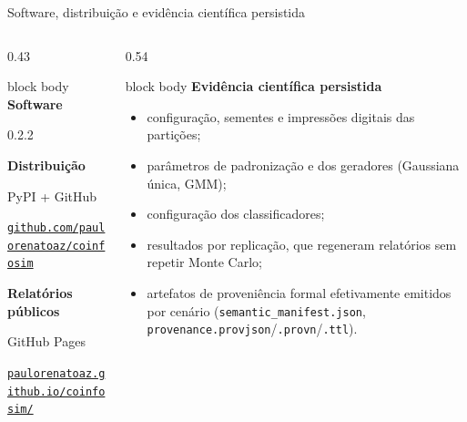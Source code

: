 \begin{frame}{Software, distribuição e evidência científica persistida}
  \begin{columns}[T,onlytextwidth]
    \begin{column}{0.43\textwidth}
      \begin{beamercolorbox}[wd=\linewidth,sep=.15cm,rounded=true]{block body}
        \fontsize{9.2}{11.0}\selectfont
        {\bfseries\color{CoInfoBlue}Software}\par
        \CoInfoSim{} 0.2.2\par\vspace{.10cm}
        {\bfseries\color{CoInfoBlue}Distribuição}\par
        PyPI + GitHub\par
        {\fontsize{7.4}{8.8}\selectfont\href{https://github.com/paulorenatoaz/coinfosim}{\texttt{github.com/\allowbreak paulorenatoaz/\allowbreak coinfosim}}}\par\vspace{.10cm}
        {\bfseries\color{CoInfoBlue}Relatórios públicos}\par
        GitHub Pages\par
        {\fontsize{7.4}{8.8}\selectfont\href{https://paulorenatoaz.github.io/coinfosim/}{\texttt{paulorenatoaz.github.io/\allowbreak coinfosim/}}}
      \end{beamercolorbox}
    \end{column}
    \begin{column}{0.54\textwidth}
      \begin{beamercolorbox}[wd=\linewidth,sep=.15cm,rounded=true]{block body}
        \fontsize{9.2}{11.0}\selectfont
        {\bfseries\color{CoInfoBlue}Evidência científica persistida}\par\vspace{.08cm}
        \begin{itemize}\setlength{\itemsep}{.02cm}
          \item configuração, sementes e impressões digitais das partições;
          \item parâmetros de padronização e dos geradores (Gaussiana única, GMM);
          \item configuração dos classificadores;
          \item resultados por replicação, que regeneram relatórios sem repetir Monte Carlo;
          \item artefatos de proveniência formal efetivamente emitidos por cenário (\texttt{semantic\_manifest.json}, \texttt{provenance.provjson}/\texttt{.provn}/\texttt{.ttl}).

\end{itemize}
\end{beamercolorbox}
\end{column}
\end{columns}
\end{frame}
